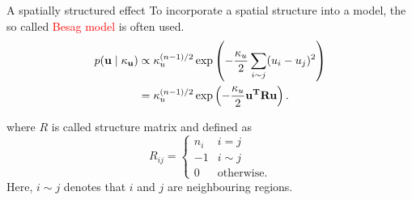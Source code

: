 \documentclass[
  ignorenonframetext,
]{beamer}
\begin{document}
\begin{frame}{A spatially structured effect}
\protect\hypertarget{a-spatially-structured-effect}{}
To incorporate a spatial structure into a model, the so called
\textcolor{red}{Besag
model} is often used. \[
\begin{aligned}
  p( \bf{u} \mid \kappa_u)& \propto \kappa_u^{(n-1)/2} \exp\left( -
  \frac{\kappa_u}{2} \sum_{i\sim j} (u_i -u_j)^2\right)\\
  & = \kappa_u^{(n-1)/2} \exp\left( -
  \frac{\kappa_u}{2} \bf{u}^T \mathbf{R} \bf{u} \right).
\end{aligned}
\]

where \(R\) is called structure matrix and defined as \[
R_{ij} =  \begin{cases}
            n_i & i=j\\
            -1 & i \sim j\\
            0 & \text{otherwise}.
        \end{cases}
\] Here, \(i \sim j\) denotes that \(i\) and \(j\) are neighbouring
regions.
\end{frame}
\end{document}
